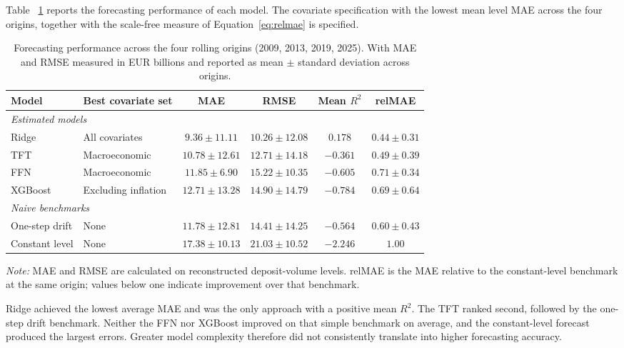 \documentclass[11pt,a4paper]{article}
\begin{document}
Table ~\ref{tab:overall_results} reports the forecasting performance of each model. The covariate
specification with the lowest mean level MAE across the four origins, together
with the scale-free measure of Equation~\eqref{eq:relmae} is specified.

\begin{table}[htbp]
\centering
\small
\caption{Forecasting performance across the four rolling origins (2009, 2013,
2019, 2025). With MAE and RMSE measured in EUR billions and reported as mean
$\pm$ standard deviation across origins.}
\label{tab:overall_results}
\begin{tabularx}{\textwidth}{l X c c c c}
\toprule
Model & Best covariate set & MAE & RMSE & Mean $R^2$ & relMAE \\
\midrule
\multicolumn{6}{l}{\textit{Estimated models}}\\[2pt]
Ridge
& All covariates
& $9.36 \pm 11.11$
& $10.26 \pm 12.08$
& $0.178$
& $0.44 \pm 0.31$ \\

TFT
& Macroeconomic
& $10.78 \pm 12.61$
& $12.71 \pm 14.18$
& $-0.361$
& $0.49 \pm 0.39$ \\

FFN
& Macroeconomic
& $11.85 \pm 6.90$
& $15.22 \pm 10.35$
& $-0.605$
& $0.71 \pm 0.34$ \\

XGBoost
& Excluding inflation
& $12.71 \pm 13.28$
& $14.90 \pm 14.79$
& $-0.784$
& $0.69 \pm 0.64$ \\
\midrule
\multicolumn{6}{l}{\textit{Naive benchmarks}}\\[2pt]
One-step drift
& None
& $11.78 \pm 12.81$
& $14.41 \pm 14.25$
& $-0.564$
& $0.60 \pm 0.43$ \\

Constant level
& None
& $17.38 \pm 10.13$
& $21.03 \pm 10.52$
& $-2.246$
& $1.00$ \\
\bottomrule
\end{tabularx}
\vspace{2pt}
\parbox{\textwidth}{\footnotesize
\textit{Note:} MAE and RMSE are calculated on reconstructed deposit-volume
levels. relMAE is the MAE relative to the constant-level benchmark at the same
origin; values below one indicate improvement over that benchmark.
}
\end{table}

Ridge achieved the lowest average MAE and was the only approach with a
positive mean $R^2$. The TFT ranked second, followed by the one-step drift
benchmark. Neither the FFN nor XGBoost improved on that simple benchmark on
average, and the constant-level forecast produced the largest errors. Greater model complexity therefore did not consistently translate into higher
forecasting accuracy. 
\end{document}
